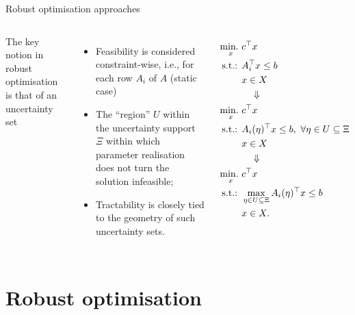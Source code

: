 \begin{frame}{Robust optimisation approaches}
	
	
	\begin{columns}
	The key notion in robust optimisation is that of an \alert{uncertainty set}
	\begin{itemize}
		\item Feasibility is considered \alert{constraint-wise}, i.e., for each row $A_i$ of $A$ (static case)
		\item The ``region'' $U$ within the uncertainty support $\Xi$ within which \alert{parameter realisation} does not turn the solution infeasible;
		\item Tractability is closely tied to the \alert{geometry} of such uncertainty sets.
	\end{itemize}
	
	\pause
	\vspace{-12pt}
	\begin{align*}
		\mathop{\text{min.} \ }_x & c^\top x \\
		\text{s.t.: } & A_i^\top x \le b \\
		& x \in X \\
		&\quad \Downarrow \\
		\mathop{\text{min.} \ }_x & c^\top x \\
		\text{s.t.: } & A_i(\eta)^\top x \le b, \ \forall \eta \in U \subseteq \Xi \\
		& x \in X \\
		&\quad \Downarrow \\
		\mathop{\text{min.} \ }_x & c^\top x \\
		\text{s.t.: } & \max_{\eta \in U \subseteq \Xi}A_i(\eta)^\top x \le b \\
			& x \in X.
	\end{align*}
	\end{columns}

\end{frame}


\section{Robust optimisation}


